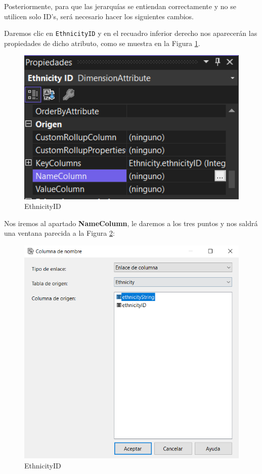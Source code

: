 \documentclass[12pt, a4paper, twoside]{article}
\begin{document}
Posteriormente, para que las jerarquías se entiendan correctamente y no se utilicen solo ID's, será necesario hacer los siguientes cambios.

Daremos clic en \texttt{EthnicityID} y en el recuadro inferior derecho nos aparecerán las propiedades de dicho atributo, como se muestra en la Figura \ref{fig:12}.

\begin{figure}[H]
	\centering
	\includegraphics[width=1\textwidth]{image/EthnicityID}
	\caption{EthnicityID}
	\label{fig:12}
\end{figure}

Nos iremos al apartado \textbf{NameColumn}, le daremos a los tres puntos y nos saldrá una ventana parecida a la Figura \ref{fig:13}: 

\begin{figure}[H]
	\centering
	\includegraphics[width=1\textwidth]{image/EthnicityID2}
	\caption{EthnicityID}
	\label{fig:13}
\end{figure}
\end{document}
